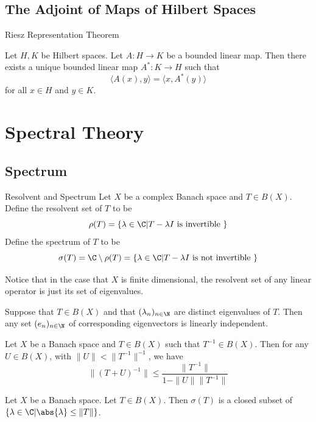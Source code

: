 \documentclass[a4paper]{article}
\begin{document}
\subsection{The Adjoint of Maps of Hilbert Spaces}
\begin{thm}{Riesz Representation Theorem}{}
\end{thm}

\begin{thm}{}{} Let $H,K$ be Hilbert spaces. Let $A:H\to K$ be a bounded linear map. Then there exists a unique bounded linear map $A^\ast:K\to H$ such that $$\langle A(x),y\rangle=\langle x,A^\ast(y)\rangle$$ for all $x\in H$ and $y\in K$. 
\end{thm}

\pagebreak
\section{Spectral Theory}
\subsection{Spectrum}
\begin{defn}{Resolvent and Spectrum}{} Let $X$ be a complex Banach space and $T\in B(X)$. Define the resolvent set of $T$ to be $$\rho(T)=\{\lambda\in\C|T-\lambda I\text{ is invertible }\}$$ Define the spectrum of $T$ to be $$\sigma(T)=\C\setminus\rho(T)=\{\lambda\in\C|T-\lambda I\text{ is not invertible }\}$$
\end{defn}

Notice that in the case that $X$ is finite dimensional, the resolvent set of any linear operator is just its set of eigenvalues. 

\begin{lmm}{}{} Suppose that $T\in B(X)$ and that $(\lambda_n)_{n\in\N}$ are distinct eigenvalues of $T$. Then any set $(e_n)_{n\in\N}$ of corresponding eigenvectors is linearly independent. 
\end{lmm}

\begin{thm}{}{} Let $X$ be a Banach space and $T\in B(X)$ such that $T^{-1}\in B(X)$. Then for any $U\in B(X)$, with $\|U\|<\|T^{-1}\|^{-1}$, we have $$\|(T+U)^{-1}\|\leq\frac{\|T^{-1}\|}{1-\|U\|\|T^{-1}\|}$$
\end{thm}

\begin{lmm}{}{} Let $X$ be a Banach space. Let $T\in B(X)$. Then $\sigma(T)$ is a closed subset of $\{\lambda\in\C|\abs{\lambda}\leq\|T\|\}$. 
\end{lmm}
\end{document}
